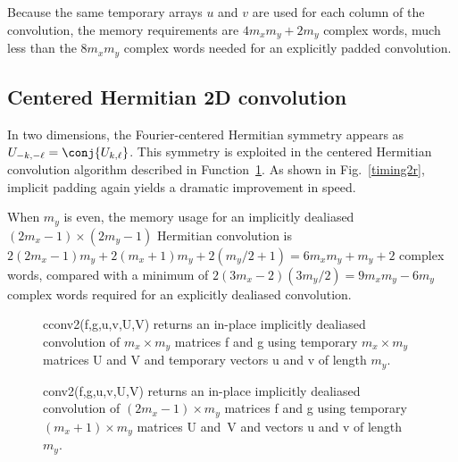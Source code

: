 \documentclass[final]{siamltex}
\begin{document}
Because the same temporary arrays $u$ and $v$ are used for each column
of the convolution, the memory requirements are $4m_xm_y+2m_y$ complex
words, much less than the $8m_xm_y$ complex words needed for an
explicitly padded convolution.

\subsection{Centered Hermitian 2D convolution}

In two dimensions, the Fourier-centered Hermitian symmetry appears as
$U_{-k,-\ell}=\conj{U_{k,\ell}}$. 
This symmetry is exploited in the centered Hermitian convolution
algorithm described in Function~{\tt\ref{conv2}}. As shown in
Fig.~\ref{timing2r}, implicit padding again yields a dramatic improvement
in speed.

When $m_y$ is even, the memory usage for an implicitly dealiased
$(2m_x-1)\times (2m_y-1)$ Hermitian convolution is
$2(2m_x-1)m_y+2(m_x+1)m_y+2(m_y/2+1)=6m_xm_y+m_y+2$ complex words, compared
with a minimum of $2(3m_x-2)(3m_y/2)=9m_xm_y-6m_y$ complex words required
for an explicitly dealiased convolution.

\begin{figure}[htbp]
\begin{minipage}{0.5\linewidth}
\begin{function}[H]
  \Return \xf\;
\caption{cconv2({\sf f},{\sf g},{\sf u},{\sf v},{\sf U},{\sf V}) 
returns an in-place implicitly dealiased convolution of
\hbox{$m_x\times m_y$} matrices {\sf f} and {\sf g} using temporary 
\hbox{$m_x\times m_y$}
matrices {\sf U} and {\sf V} and temporary vectors {\sf u} and {\sf v} of
length $m_y$.}\label{cconv2}
\end{function}
\end{minipage}
%
\begin{minipage}{0.5\linewidth}
\begin{function}[H]
  \Return \xf\;
\caption{conv2({\sf f},{\sf g},{\sf u},{\sf v},{\sf U},{\sf V}) 
returns an in-place implicitly dealiased convolution of $(2m_x-1)\times
m_y$ matrices {\sf f} and {\sf g} using temporary $(m_x+1)\times m_y$ matrices 
{\sf U} and~{\sf V} and vectors {\sf u} and {\sf v} of length~$m_y$.
}\label{conv2}
\end{function}
\end{minipage}
\end{figure}
\end{document}
